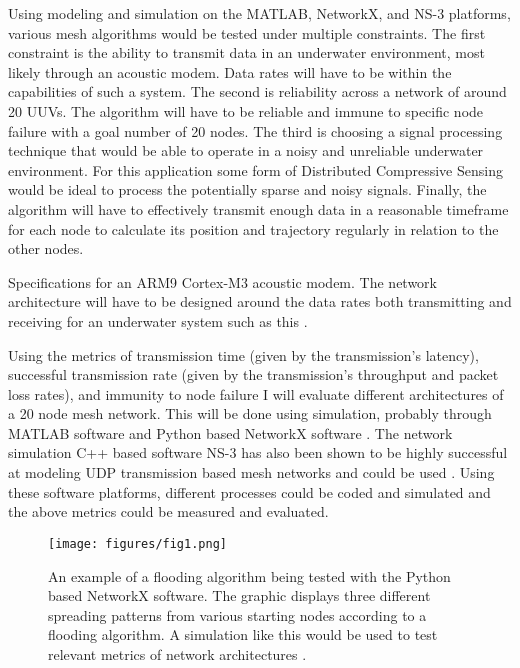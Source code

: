 \documentclass[10pt]{article}
\begin{document}
Using modeling and simulation on the MATLAB, NetworkX, and NS-3 platforms, various mesh algorithms would be tested under multiple constraints. The first constraint is the ability to transmit data in an underwater environment, most likely through an acoustic modem. Data rates will have to be within the capabilities of such a system. The second is reliability across a network of around 20 UUVs. The algorithm will have to be reliable and immune to specific node failure with a goal number of 20 nodes. The third is choosing a signal processing technique that would be able to operate in a noisy and unreliable underwater environment. For this application some form of Distributed Compressive Sensing would be ideal to process the potentially sparse and noisy signals\cite{baron2009distributed}. Finally, the algorithm will have to effectively transmit enough data in a reasonable timeframe for each node to calculate its position and trajectory regularly in relation to the other nodes. 
\begin{table}[h]
\caption{Specifications for an ARM9 Cortex-M3 acoustic modem. The network architecture will have to be designed around the data rates both transmitting and receiving for an underwater system such as this \cite{arm2013acoustic}.}
\label{tab:1}
\begin{center}

\end{center}
\end{table}

Using the metrics of transmission time (given by the transmission’s latency), successful transmission rate (given by the transmission’s throughput and packet loss rates), and immunity to node failure I will evaluate different architectures of a 20 node mesh network. This will be done using simulation, probably through MATLAB software and Python based NetworkX software \cite{hagberg2008exploring}. The network simulation C++ based software NS-3 has also been shown to be highly successful at modeling UDP transmission based mesh networks and could be used \cite{dugaev2020wireless}. Using these software platforms, different processes could be coded and simulated and the above metrics could be measured and evaluated.
\begin{figure}[t]
\begin{center}
\texttt{[image: figures/fig1.png]}
\end{center}
\caption{An example of a flooding algorithm being tested with the Python based NetworkX software. The graphic displays three different spreading patterns from various starting nodes according to a flooding algorithm. A simulation like this would be used to test relevant metrics of network architectures \cite{sphyce2015networkx}.}
\label{fig:2}
\end{figure}
\end{document}
